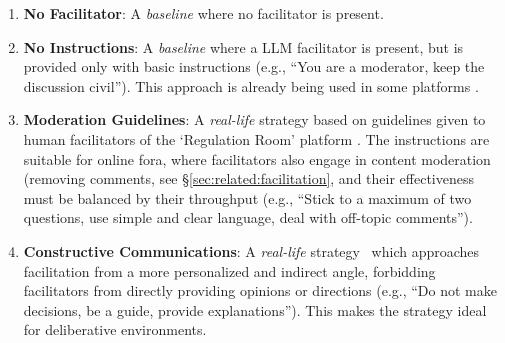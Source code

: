 \begin{enumerate}
	\item \textbf{No Facilitator}: A \emph{baseline} where no facilitator is present.
	
	\item \textbf{No Instructions}: A \emph{baseline} where a LLM facilitator is present, but is provided only with basic instructions (e.g., “You are a moderator, keep the discussion civil”). This approach is already being used in some platforms \cite{Tsai_Deliberate_Lab_Open-Source_2025}. 
	
	\item \textbf{Moderation Guidelines}: A \emph{real-life} strategy based on guidelines given to human facilitators of the `Regulation Room' platform \cite{Cornell_eRulemaking2017}. The instructions are suitable for online fora, where facilitators also engage in content moderation (removing comments, see \S\ref{sec:related:facilitation}, and their effectiveness must be balanced by their throughput (e.g., ``Stick to a maximum of two questions, use simple and clear language, deal with off-topic comments'').
	
	\item \textbf{Constructive Communications}: A \emph{real-life} strategy~\cite{dimitra-guide} which approaches facilitation from a more personalized and indirect angle, forbidding facilitators from directly providing opinions or directions (e.g., ``Do not make decisions, be a guide, provide explanations''). This makes the strategy ideal for deliberative environments.
\end{enumerate}

